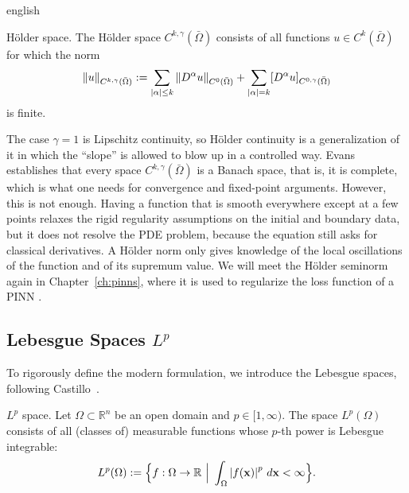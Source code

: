 \begin{hyphenrules}{english}
\begin{definicion}{Hölder space.}\label{def:holder-space}
The Hölder space $C^{k,\gamma}(\bar\Omega)$ consists of all functions $u\in C^k(\bar\Omega)$ for which
the norm
\begin{equation}
  \left\lVert u \right\rVert_{C^{k,\gamma}(\bar\Omega)}:=\sum_{\left\lvert \alpha \right\rvert\le k}\left\lVert D^\alpha u \right\rVert_{C^0(\bar\Omega)}
  +\sum_{\left\lvert \alpha \right\rvert=k}[D^\alpha u]_{C^{0,\gamma}(\bar\Omega)}
  \label{eq:holder-norm}
\end{equation}
is finite.
\end{definicion}

The case $\gamma=1$ is Lipschitz continuity, so Hölder continuity is a generalization of it in which the
``slope'' is allowed to blow up in a controlled way. Evans~\cite{evans2010} establishes that every space
$C^{k,\gamma}(\bar\Omega)$ is a Banach space, that is, it is complete, which is what one needs for
convergence and fixed-point arguments. However, this is not enough. Having a function that is smooth
everywhere except at a few points relaxes the rigid regularity assumptions on the initial and boundary
data, but it does not resolve the PDE problem, because the equation still asks for classical
derivatives. A Hölder norm only gives knowledge of the local oscillations of the function and of its
supremum value. We will meet the Hölder seminorm again in Chapter~\ref{ch:pinns}, where it is used to
regularize the loss function of a PINN \cite{shin2020convergence}.

\subsection{Lebesgue Spaces \texorpdfstring{$L^p$}{Lp}}\label{subsec:lp}

To rigorously define the modern formulation, we introduce the Lebesgue spaces, following
Castillo~\cite{castillo2014}.

\begin{definicion}{$L^p$ space.}\label{def:lp}
Let $\Omega\subset\mathbb{R}^n$ be an open domain and $p\in[1,\infty)$. The space $L^p(\Omega)$ consists of all
(classes of) measurable functions whose $p$-th power is Lebesgue integrable:
\begin{equation}
  L^p(\Omega):=\Big\{f:\Omega\to\mathbb{R}\ \Big|\ \int_\Omega\abs{f(\mathbf{x})}^p\,d\mathbf{x}<\infty\Big\}.
  \label{eq:lp}
\end{equation}
\end{definicion}


\end{hyphenrules}
